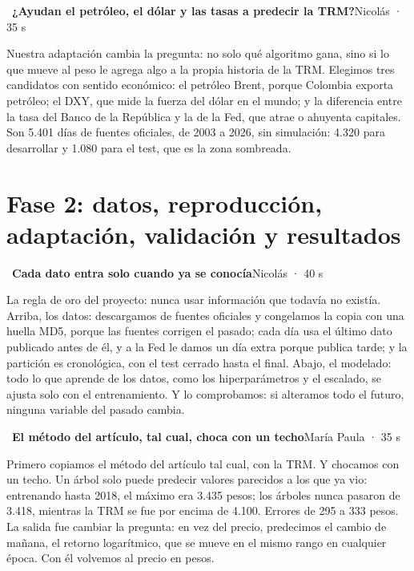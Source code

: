 \documentclass[11pt,letterpaper]{article}
\newcommand{\diapo}[4]{\par\bigskip{\color{oro}\textbf{#1.}}~\textbf{#2}\hfill{\small #3 · #4}\par\nopagebreak\smallskip}
\begin{document}
\diapo{4}{¿Ayudan el petróleo, el dólar y las tasas a predecir la TRM?}{Nicolás}{35 s}
Nuestra adaptación cambia la pregunta: no solo qué algoritmo gana, sino si lo que mueve al peso le agrega algo a la propia historia de la TRM. Elegimos tres candidatos con sentido económico: el petróleo Brent, porque Colombia exporta petróleo; el DXY, que mide la fuerza del dólar en el mundo; y la diferencia entre la tasa del Banco de la República y la de la Fed, que atrae o ahuyenta capitales. Son 5.401 días de fuentes oficiales, de 2003 a 2026, sin simulación: 4.320 para desarrollar y 1.080 para el test, que es la zona sombreada.

\section*{Fase 2: datos, reproducción, adaptación, validación y resultados}
\diapo{5}{Cada dato entra solo cuando ya se conocía}{Nicolás}{40 s}
La regla de oro del proyecto: nunca usar información que todavía no existía. Arriba, los datos: descargamos de fuentes oficiales y congelamos la copia con una huella MD5, porque las fuentes corrigen el pasado; cada día usa el último dato publicado antes de él, y a la Fed le damos un día extra porque publica tarde; y la partición es cronológica, con el test cerrado hasta el final. Abajo, el modelado: todo lo que aprende de los datos, como los hiperparámetros y el escalado, se ajusta solo con el entrenamiento. Y lo comprobamos: si alteramos todo el futuro, ninguna variable del pasado cambia.
\par{}

\diapo{6}{El método del artículo, tal cual, choca con un techo}{María Paula}{35 s}
Primero copiamos el método del artículo tal cual, con la TRM. Y chocamos con un techo. Un árbol solo puede predecir valores parecidos a los que ya vio: entrenando hasta 2018, el máximo era 3.435 pesos; los árboles nunca pasaron de 3.418, mientras la TRM se fue por encima de 4.100. Errores de 295 a 333 pesos. La salida fue cambiar la pregunta: en vez del precio, predecimos el cambio de mañana, el retorno logarítmico, que se mueve en el mismo rango en cualquier época. Con él volvemos al precio en pesos.
\par{}
\end{document}
